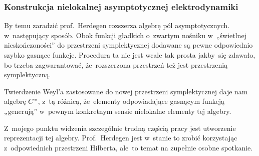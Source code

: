 \documentclass[10pt,t]{beamer}
\begin{document}





\begin{frame}
  \frametitle{Konstrukcja nielokalnej asymptotycznej
    elektrodynamiki}


  By temu zaradzić prof.~Herdegen rozszerza algebrę pól asymptotycznych.
  w~następujący sposób. Obok funkcji gładkich o~zwartym nośniku
  w~„świetlnej nieskończoności” do przestrzeni symplektycznej dodawane
  są pewne odpowiednio szybko gasnące funkcje. Procedura ta nie jest wcale
  tak prosta jakby~się zdawało, bo trzeba zagwarantować, że~rozszerzona
  przestrzeń też jest przestrzenią symplektyczną.

  Twierdzenie Weyl’a zastosowane do nowej przestrzeni symplektycznej daje
  nam algebrę $C^{ \hspace{0.05em} * }$, z~tą różnicą, że~elementy
  odpowiadające gasnącym funkcją „generują” w~pewnym konkretnym sensie
  \alert{nielokalne} elementy tej algebry.

  Z~mojego punktu widzenia szczególnie trudną częścią pracy jest utworzenie
  reprezentacji tej algebry. Prof.~Herdegen jest w~stanie to zrobić
  korzystając z~odpowiednich
  przestrzeni Hilberta, ale~to temat na zupełnie osobne spotkanie.

\end{frame}
\end{document}
